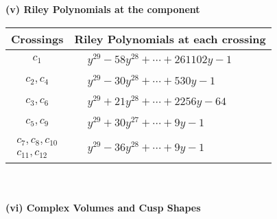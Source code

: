 \documentclass[1p]{elsarticle_modified}
\theoremstyle{definition}
\begin{document}
\flushleft \textbf{(v) Riley Polynomials at the component}\newline \\
\begin{tabular}{m{50pt}|m{274pt}}
Crossings & \hspace{64pt}Riley Polynomials at each crossing \\
\hline $$\begin{aligned}c_{1}\end{aligned}$$&$\begin{aligned}
&y^{29}-58 y^{28}+\cdots+261102 y-1
\end{aligned}$\\
\hline $$\begin{aligned}c_{2},c_{4}\end{aligned}$$&$\begin{aligned}
&y^{29}-30 y^{28}+\cdots+530 y-1
\end{aligned}$\\
\hline $$\begin{aligned}c_{3},c_{6}\end{aligned}$$&$\begin{aligned}
&y^{29}+21 y^{28}+\cdots+2256 y-64
\end{aligned}$\\
\hline $$\begin{aligned}c_{5},c_{9}\end{aligned}$$&$\begin{aligned}
&y^{29}+30 y^{27}+\cdots+9 y-1
\end{aligned}$\\
\hline $$\begin{aligned}c_{7},c_{8},c_{10}\\c_{11},c_{12}\end{aligned}$$&$\begin{aligned}
&y^{29}-36 y^{28}+\cdots+9 y-1
\end{aligned}$\\
\hline
\end{tabular}\\~\\
\newpage\flushleft \textbf{(vi) Complex Volumes and Cusp Shapes}
\end{document}
